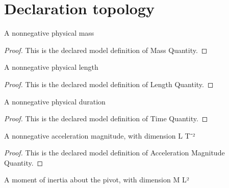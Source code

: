\section{Declaration topology}
\begin{definition}
  \label{def:physics:phyx-mini-0229:phyxminiproblems-problemphyxmini0229-massquantity}
  A nonnegative physical mass
\end{definition}
\begin{proof}
  This is the declared model definition of Mass Quantity.
\end{proof}
\begin{definition}
  \label{def:physics:phyx-mini-0229:phyxminiproblems-problemphyxmini0229-lengthquantity}
  A nonnegative physical length
\end{definition}
\begin{proof}
  This is the declared model definition of Length Quantity.
\end{proof}
\begin{definition}
  \label{def:physics:phyx-mini-0229:phyxminiproblems-problemphyxmini0229-timequantity}
  A nonnegative physical duration
\end{definition}
\begin{proof}
  This is the declared model definition of Time Quantity.
\end{proof}
\begin{definition}
  \label{def:physics:phyx-mini-0229:phyxminiproblems-problemphyxmini0229-accelerationmagnitudequantity}
  A nonnegative acceleration magnitude, with dimension L T⁻²
\end{definition}
\begin{proof}
  This is the declared model definition of Acceleration Magnitude Quantity.
\end{proof}
\begin{definition}
  \label{def:physics:phyx-mini-0229:phyxminiproblems-problemphyxmini0229-momentofinertiaquantity}
  A moment of inertia about the pivot, with dimension M L²
\end{definition}

